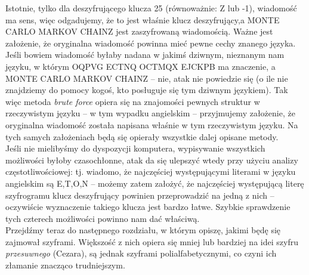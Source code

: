 \documentclass[a4paper]{article}
\begin{document}
Istotnie, tylko dla deszyfrującego klucza 25 (równoważnie: Z lub -1), wiadomość ma sens, więc odgadujemy, że to jest właśnie klucz deszyfrujący,a MONTE CARLO MARKOV CHAINZ jest zaszyfrowaną wiadomością. Ważne jest założenie, że oryginalna wiadomość powinna mieć pewne cechy znanego języka. Jeśli bowiem wiadomość byłaby nadana w jakimś dziwnym, nieznanym nam języku, w którym OQPVG ECTNQ OCTMQX EJCKPB ma znaczenie, a MONTE CARLO MARKOV CHAINZ – nie, atak nie powiedzie się (o ile nie znajdziemy do pomocy kogoś, kto posługuje się tym dziwnym językiem). Tak więc metoda \textit{brute force} opiera się na znajomości pewnych struktur w rzeczywistym języku – w tym wypadku angielskim – przyjmujemy założenie, że oryginalna wiadomość została napisana właśnie w tym rzeczywistym języku. Na tych samych założeniach będą się opierały wszystkie dalej opisane metody.\\
Jeśli nie mielibyśmy do dyspozycji komputera, wypisywanie wszystkich możliwości byłoby czasochłonne, atak da się ulepszyć wtedy przy użyciu analizy częstotliwościowej: tj. wiadomo, że najczęściej występującymi literami w języku angielskim są E,T,O,N – możemy zatem założyć, że najczęściej występującą literę szyfrogramu klucz deszyfrujący powinien przeprowadzić na jedną z nich – oczywiście wyznaczenie takiego klucza jest bardzo łatwe. Szybkie sprawdzenie tych czterech możliwości powinno nam dać właściwą.
\\
Przejdźmy teraz do następnego rozdziału, w którym opiszę, jakimi będę się zajmował szyframi. Większość z nich opiera się mniej lub bardziej na idei szyfru \textit{przesuwnego} (Cezara), są jednak szyframi polialfabetycznymi, co czyni ich złamanie znacząco trudniejszym.\\\\
\end{document}

